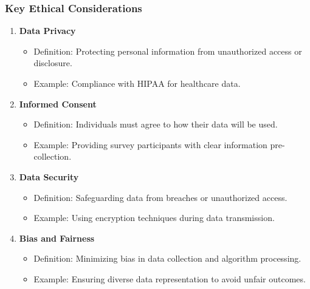 \documentclass[aspectratio=169]{beamer}
\begin{document}
\begin{frame}[fragile]
    \frametitle{Key Ethical Considerations}
    \begin{enumerate}
        \item \textbf{Data Privacy}
            \begin{itemize}
                \item Definition: Protecting personal information from unauthorized access or disclosure.
                \item Example: Compliance with HIPAA for healthcare data.
            \end{itemize}
        \item \textbf{Informed Consent}
            \begin{itemize}
                \item Definition: Individuals must agree to how their data will be used.
                \item Example: Providing survey participants with clear information pre-collection.
            \end{itemize}
        \item \textbf{Data Security}
            \begin{itemize}
                \item Definition: Safeguarding data from breaches or unauthorized access.
                \item Example: Using encryption techniques during data transmission.
            \end{itemize}
        \item \textbf{Bias and Fairness}
            \begin{itemize}
                \item Definition: Minimizing bias in data collection and algorithm processing.
                \item Example: Ensuring diverse data representation to avoid unfair outcomes.
            \end{itemize}
    \end{enumerate}
\end{frame}
\end{document}

